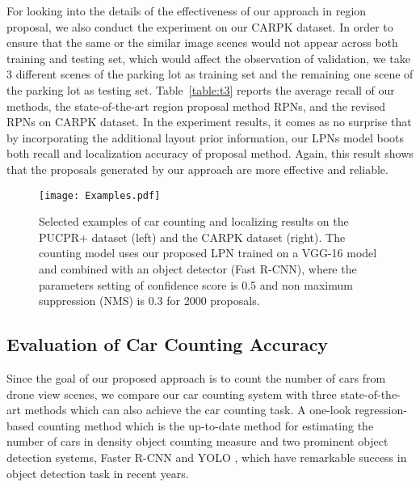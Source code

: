 \documentclass[10pt,twocolumn,letterpaper]{article}
\begin{document}
For looking into the details of the effectiveness of our approach in region proposal, we also conduct the experiment on our CARPK dataset. In order to ensure that the same or the similar image scenes would not appear across both training and testing set, which would affect the observation of validation, we take 3 different scenes of the parking lot as training set and the remaining one scene of the parking lot as testing set. Table~\ref{table:t3} reports the average recall of our methods, the state-of-the-art region proposal method RPNs, and the revised RPNs on CARPK dataset. In the experiment results, it comes as no surprise that by incorporating the additional layout prior information, our LPNs model boots both recall and localization accuracy of proposal method. Again, this result shows that the proposals generated by our approach are more effective and reliable.

\begin{figure*}[t]
\begin{center}
   \texttt{[image: Examples.pdf]}
\end{center}
   \caption{Selected examples of car counting and localizing results on the PUCPR+ dataset (left) and the CARPK dataset (right). The counting model uses our proposed LPN trained on a VGG-16 model and combined with an object detector (Fast R-CNN), where the parameters setting of confidence score is 0.5 and non maximum suppression (NMS) is 0.3 for 2000 proposals.}
\label{figure:Examples}
\end{figure*}

\subsection{Evaluation of Car Counting Accuracy}

Since the goal of our proposed approach is to count the number of cars from drone view scenes, we compare our car counting system with three state-of-the-art methods which can also achieve the car counting task. A one-look regression-based counting method \cite{04_mundhenk2016large} which is the up-to-date method for estimating the number of cars in density object counting measure and two prominent object detection systems, Faster R-CNN \cite{21_ren2015faster} and YOLO \cite{43_redmon2016you}, which have remarkable success in object detection task in recent years. 
\end{document}
